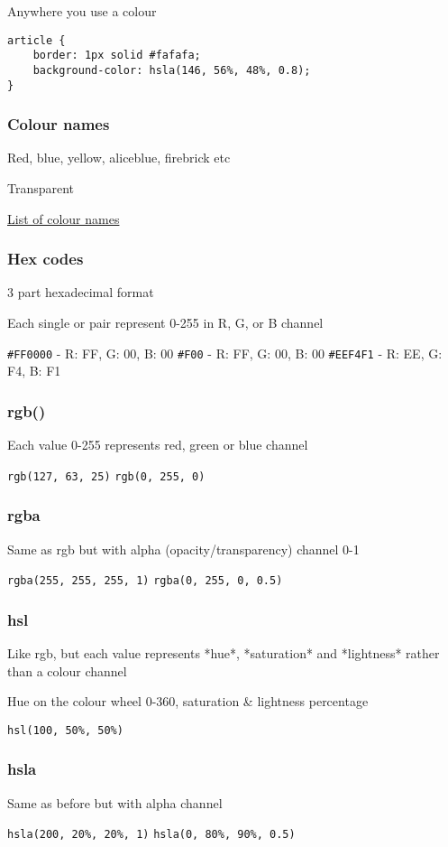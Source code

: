 Anywhere you use a colour

\begin{verbatim}
article {
    border: 1px solid #fafafa;
    background-color: hsla(146, 56%, 48%, 0.8);
}
\end{verbatim}

\subsubsection{Colour names}

Red, blue, yellow, aliceblue, firebrick etc

Transparent

\href{https://en.wikipedia.org/wiki/X11_color_names}{List of colour names}


\subsubsection{Hex codes}

3 part hexadecimal format

Each single or pair represent 0-255 in R, G, or B channel

\texttt{\#FF0000} - R: FF, G: 00, B: 00
\texttt{\#F00} - R: FF, G: 00, B: 00
\texttt{\#EEF4F1} - R: EE, G: F4, B: F1

\subsubsection{rgb()}

Each value 0-255 represents red, green or blue channel

\texttt{rgb(127, 63, 25)}
\texttt{rgb(0, 255, 0)}

\subsubsection{rgba}

Same as rgb but with alpha (opacity/transparency) channel 0-1

\texttt{rgba(255, 255, 255, 1)}
\texttt{rgba(0, 255, 0, 0.5)}

\subsubsection{hsl}

Like rgb, but each value represents *hue*, *saturation* and *lightness* rather than a colour channel

Hue on the colour wheel 0-360, saturation \& lightness percentage

\texttt{hsl(100, 50\%, 50\%)}

\subsubsection{hsla}

Same as before but with alpha channel

\texttt{hsla(200, 20\%, 20\%, 1)}
\texttt{hsla(0, 80\%, 90\%, 0.5)}
